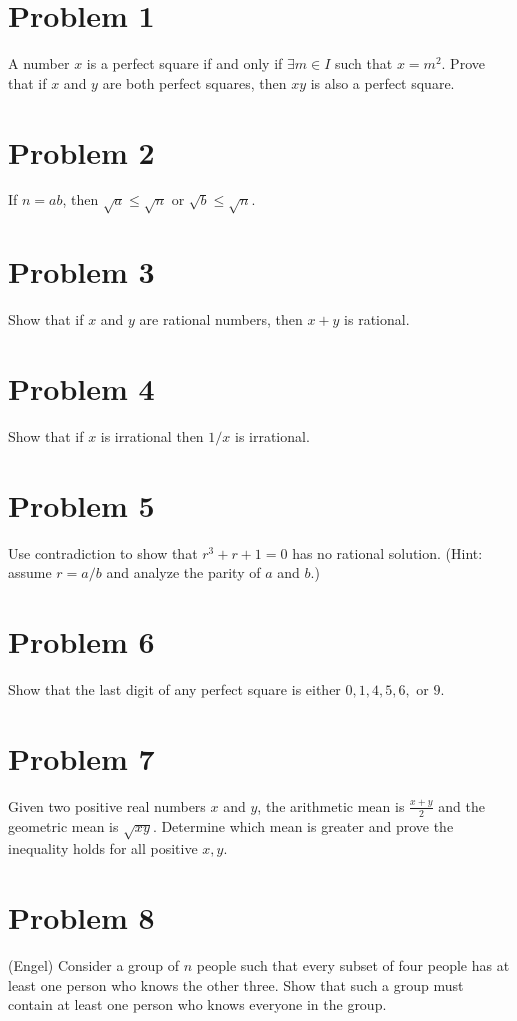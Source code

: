 \newcommand{\hmwkTitle}{Homework 1 Extra}
\newcommand{\hmwkDueDate}{Tuesday, January 12, 2016}
\newcommand{\hmwkHeaderTitle}{ICCS206 Discrete Mathematic: Homework 1 Extra}


\section*{Problem 1}
A number $x$ is a perfect square if and only if $\exists m \in I$ such that $x = m^2$. Prove that if $x$ and $y$ are both perfect squares, then $xy$ is also a perfect square.

\section*{Problem 2}
If $n = ab$, then $\sqrt{a} \le \sqrt{n}$ or $\sqrt{b} \le \sqrt{n}$.

\section*{Problem 3}
Show that if $x$ and $y$ are rational numbers, then $x + y$ is rational.

\section*{Problem 4}
Show that if $x$ is irrational then $1/x$ is irrational.

\section*{Problem 5}
Use contradiction to show that $r^3 + r + 1 = 0$ has no rational solution. (Hint: assume $r = a/b$ and analyze the parity of $a$ and $b$.)

\section*{Problem 6}
Show that the last digit of any perfect square is either $0, 1, 4, 5, 6,$ or $9$.

\section*{Problem 7}
Given two positive real numbers $x$ and $y$, the arithmetic mean is $\frac{x+y}{2}$ and the geometric mean is $\sqrt{xy}$. Determine which mean is greater and prove the inequality holds for all positive $x,y$.

\section*{Problem 8}
(Engel) Consider a group of $n$ people such that every subset of four people has at least one person who knows the other three. Show that such a group must contain at least one person who knows everyone in the group.


